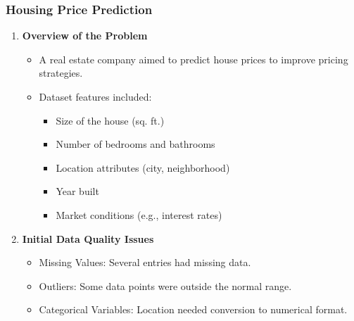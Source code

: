 \documentclass[aspectratio=169]{beamer}
\begin{document}
\begin{frame}[fragile]
    \frametitle{Housing Price Prediction}
    \begin{enumerate}
        \item \textbf{Overview of the Problem}
        \begin{itemize}
            \item A real estate company aimed to predict house prices to improve pricing strategies.
            \item Dataset features included:
                \begin{itemize}
                    \item Size of the house (sq. ft.)
                    \item Number of bedrooms and bathrooms
                    \item Location attributes (city, neighborhood)
                    \item Year built
                    \item Market conditions (e.g., interest rates)
                \end{itemize}
        \end{itemize}
        
        \item \textbf{Initial Data Quality Issues}
        \begin{itemize}
            \item Missing Values: Several entries had missing data.
            \item Outliers: Some data points were outside the normal range.
            \item Categorical Variables: Location needed conversion to numerical format.
        \end{itemize}
    \end{enumerate}
\end{frame}
\end{document}

